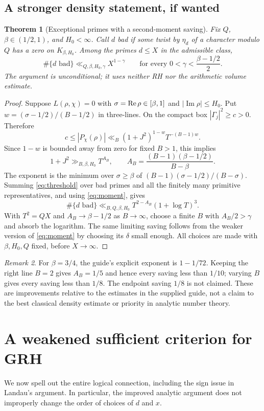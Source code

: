 \documentclass[11pt,a4paper]{article}
\newtheorem{theorem}{Theorem}[section]
\theoremstyle{remark}\newtheorem{remark}[theorem]{Remark}
\newcommand{\Ima}{\operatorname{Im}}\newcommand{\E}{\mathcal E}\newcommand{\pos}[1]{\left(#1\right)_+}
\begin{document}
\subsection{A stronger density statement, if wanted}
\begin{theorem}[Exceptional primes with a second-moment saving]\label{thm:density}
Fix $Q$, $\beta\in(1/2,1)$, and $H_0<\infty$. Call $d$ bad if some twist by $\eta_d$ of a character modulo $Q$ has a zero on $K_{\beta,H_0}$. Among the primes $d\le X$ in the admissible class,
\[\#\{d\text{ bad}\}\ll_{Q,\beta,H_0,\gamma}X^{1-\gamma}
\qquad\text{for every }0<\gamma<\frac{\beta-1/2}{2}.
\]
The argument is unconditional; it uses neither RH nor the arithmetic volume estimate.
\end{theorem}
\begin{proof}
Suppose $L(\rho,\chi)=0$ with $\sigma=\operatorname{Re}\rho\in[\beta,1]$ and $|\Ima\rho|\le H_0$. Put $w=(\sigma-1/2)/(B-1/2)$ in three-lines. On the compact box $|\Gamma_j|^2\ge c>0$. Therefore
\[c\le |P_\chi(\rho)|\ll_B(1+J^2)^{1-w}T^{-(B-1)w}.\]
Since $1-w$ is bounded away from zero for fixed $B>1$, this implies
\begin{equation}\label{eq:threshold}
1+J^2\gg_{B,\beta,H_0} T^{A_B},\qquad
A_B=\frac{(B-1)(\beta-1/2)}{B-\beta}.
\end{equation}
The exponent is the minimum over $\sigma\ge\beta$ of $(B-1)(\sigma-1/2)/(B-\sigma)$. Summing \eqref{eq:threshold} over bad primes and all the finitely many primitive representatives, and using \eqref{eq:moment}, gives
\[\#\{d\text{ bad}\}\ll_{B,Q,\beta,H_0} T^{2-A_B}(1+\log T)^3.
\]
With $T^2=QX$ and $A_B\to\beta-1/2$ as $B\to\infty$, choose a finite $B$ with $A_B/2>\gamma$ and absorb the logarithm. The same limiting saving follows from the weaker version of \eqref{eq:moment} by choosing its $\delta$ small enough. All choices are made with $\beta,H_0,Q$ fixed, before $X\to\infty$.
\end{proof}
\begin{remark}
For $\beta=3/4$, the guide's explicit exponent is $1-1/72$. Keeping the right line $B=2$ gives $A_B=1/5$ and hence every saving less than $1/10$; varying $B$ gives every saving less than $1/8$. The endpoint saving $1/8$ is not claimed. These are improvements relative to the estimates in the supplied guide, not a claim to the best classical density estimate or priority in analytic number theory.
\end{remark}

\section{A weakened sufficient criterion for GRH}\label{sec:criterion}
We now spell out the entire logical connection, including the sign issue in Landau's argument. In particular, the improved analytic argument does not improperly change the order of choices of $d$ and $x$.
\end{document}
